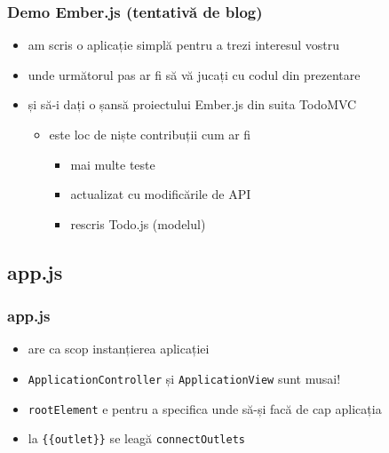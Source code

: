 \documentclass[compress]{beamer}
\begin{document}
\begin{frame}

\frametitle{Demo Ember.js (tentativă de blog)}

\begin{itemize}[<+->]
  \item am scris o aplicație simplă pentru a trezi interesul vostru
  \item unde următorul pas ar fi să vă jucați cu codul din prezentare
  \item și să-i dați o șansă proiectului Ember.js din suita TodoMVC
  \begin{itemize}[<+->]
    \item este loc de niște contribuții cum ar fi
    \begin{itemize}[<+->]
      \item mai multe teste
      \item actualizat cu modificările de API
      \item rescris Todo.js (modelul)
    \end{itemize}
  \end{itemize}
\end{itemize}

\end{frame}

\subsection{app.js}

\begin{frame}

\frametitle{app.js}

\begin{itemize}[<+->]
  \item are ca scop instanțierea aplicației
  \item \texttt{ApplicationController} și \texttt{ApplicationView} sunt musai!
  \item \texttt{rootElement} e pentru a specifica unde să-și facă de cap aplicația
  \item la \texttt{\{\{outlet\}\}} se leagă \texttt{connectOutlets}
\end{itemize}

\inputminted[fontsize=\tiny,gobble=2,linenos=true,firstline=6,lastline=16]{javascript}{code/js/app.js}

\end{frame}
\end{document}
